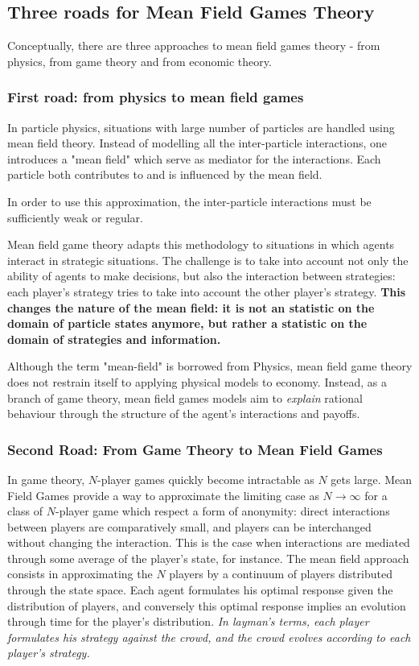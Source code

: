 \documentclass{article}
\begin{document}
\subsection{Three roads for Mean Field Games Theory}

Conceptually, there are three approaches to mean field games theory - from physics, from game theory and from economic theory.

\subsubsection{First road: from physics to mean field games}

In particle physics, situations with large number of particles are handled using mean field theory. Instead of modelling all the inter-particle interactions, one introduces a "mean field" which serve as mediator for the interactions. Each particle both contributes to and is influenced by the mean field.

In order to use this approximation, the inter-particle interactions must be sufficiently weak or regular.

Mean field game theory adapts this methodology to situations in which agents interact in strategic situations. The challenge is to take into account not only the ability of agents to make decisions, but also the interaction between strategies: each player's strategy tries to take into account the other player's strategy.
\textbf{This changes the nature of the mean field: it is not an statistic on the domain of particle states anymore, but rather a statistic on the domain of strategies and information.}

Although the term "mean-field" is borrowed from Physics, mean field game theory does not restrain itself to applying physical models to economy. Instead, as a branch of game theory, mean field games models aim to \textit{explain} rational behaviour through the structure of the agent's interactions and payoffs. \cite{cousin2010paris}

\subsubsection{Second Road: From Game Theory to Mean Field Games}

In game theory, $N$-player games quickly become intractable as $N$ gets large. Mean Field Games provide a way to approximate the limiting case as $N \to \infty$ for a class of $N$-player game which respect a form of anonymity: direct interactions between players are comparatively small, and players can be interchanged without changing the interaction. This is the case when interactions are mediated through some average of the player's state, for instance.
The mean field approach consists in approximating the $N$ players by a continuum of players distributed through the state space. Each agent formulates his optimal response given the distribution of players, and conversely this optimal response implies an evolution through time for the player's distribution.
\textit{In layman's terms, each player formulates his strategy against the crowd, and the crowd evolves according to each player's strategy.}
\end{document}
